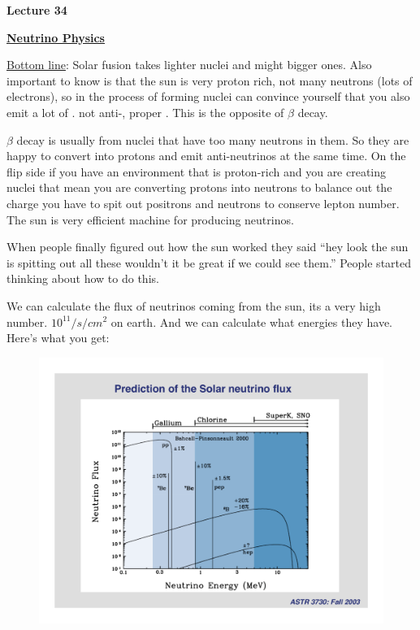 \usepackage{fancyhdr}

\fancyhf{}


\thispagestyle{fancy}

\begin{center}
{\huge \textbf{Lecture 34}}
\end{center}

{\fontsize{14}{16}\selectfont

\textbf{\underline{Neutrino Physics}} 

\underline{Bottom line}: Solar fusion takes lighter nuclei and might bigger ones.
Also important to know is that the sun is very proton rich, not many neutrons (lots of electrons), so in the process of forming nuclei can convince yourself that you also emit a lot of \nus. 
not anti-\nus, proper \nus.   
This is the opposite of $\beta$ decay. 

$\beta$ decay is usually from nuclei that have too many neutrons in them. 
So they are happy to convert into protons and emit anti-neutrinos at the same time. 
On the flip side if you have an environment that is proton-rich and you are creating nuclei that mean you are converting protons into neutrons to balance out the charge you have to spit out positrons and neutrons to conserve lepton number. 
The sun is very efficient machine for producing neutrinos. 

When people finally figured out how the sun worked they said ``hey look the sun is spitting out all these \nus wouldn't it be great if we could see them.''
People started thinking about how to do this. 

We can calculate the flux of neutrinos coming from the sun,  its a very high number. $10^{11}/s/cm^2$ on earth. 
And we can calculate what energies they have.  
Here's what you get:

\begin{figure}[h!]
\centering
\includegraphics[width=1.0\textwidth]{./NuFromSun.pdf}
\end{figure}

}
